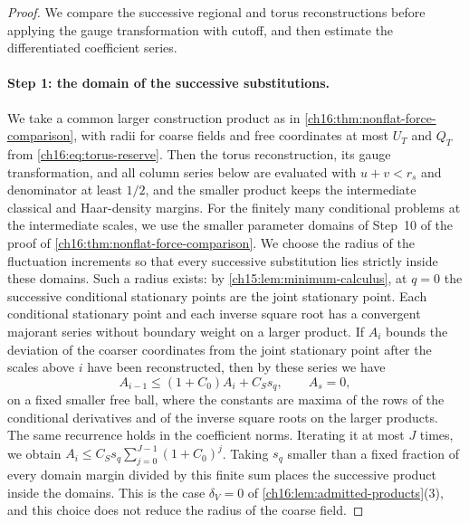 \begin{proof}
We compare the successive regional and torus reconstructions before applying the gauge transformation with cutoff, and then estimate the differentiated coefficient series.

\paragraph{Step 1: the domain of the successive substitutions.}
We take a common larger construction product as in \cref{ch16:thm:nonflat-force-comparison}, with radii for coarse fields and free coordinates at most $U_T$ and $Q_T$ from \eqref{ch16:eq:torus-reserve}. Then the torus reconstruction, its gauge transformation, and all column series below are evaluated with $u+v<r_s$ and denominator at least $1/2$, and the smaller product keeps the intermediate classical and Haar-density margins. For the finitely many conditional problems at the intermediate scales, we use the smaller parameter domains of Step~10 of the proof of \cref{ch16:thm:nonflat-force-comparison}. We choose the radius of the fluctuation increments so that every successive substitution lies strictly inside these domains. Such a radius exists: by \cref{ch15:lem:minimum-calculus}, at $q=0$ the successive conditional stationary points are the joint stationary point. Each conditional stationary point and each inverse square root has a convergent majorant series without boundary weight on a larger product. If $A_i$ bounds the deviation of the coarser coordinates from the joint stationary point after the scales above $i$ have been reconstructed, then by these series we have
\begin{equation}\label{ch16:eq:unperturbed-sequential-budget}
 A_{i-1}\le(1+C_0)A_i+C_Ss_q,\qquad A_s=0,
\end{equation}
on a fixed smaller free ball, where the constants are maxima of the rows of the conditional derivatives and of the inverse square roots on the larger products. The same recurrence holds in the coefficient norms. Iterating it at most $J$ times, we obtain $A_i\le C_Ss_q\sum_{j=0}^{J-1}(1+C_0)^j$. Taking $s_q$ smaller than a fixed fraction of every domain margin divided by this finite sum places the successive product inside the domains. This is the case $\delta_V=0$ of \cref{ch16:lem:admitted-products}(3), and this choice does not reduce the radius of the coarse field.


\end{proof}
